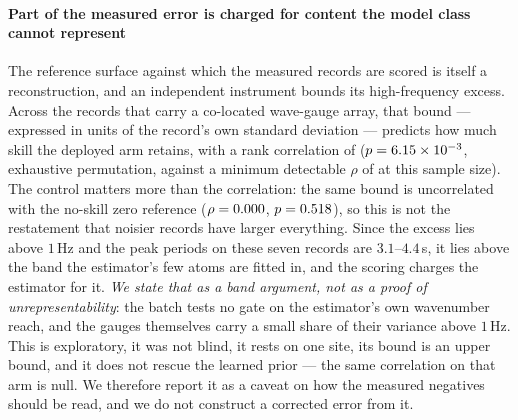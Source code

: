 \documentclass[review]{elsarticle}
\begin{document}
\paragraph{Part of the measured error is charged for content the model class cannot represent}
The reference surface against which the measured records are scored is itself a
reconstruction, and an independent instrument bounds its high-frequency excess. Across
the \RSevenN{} records that carry a co-located wave-gauge array, that bound --- expressed
in units of the record's own standard deviation --- predicts how much skill the deployed
arm retains, with a rank correlation of \RSevenRho{} ($p = 6.15\times 10^{-3}{}$, exhaustive
permutation, against a minimum detectable $\rho$ of \RSevenMDE{} at this sample size).
The control matters more than the correlation: the same bound is uncorrelated with the
no-skill zero reference ($\rho = 0.000{}$, $p = 0.518{}$), so this is not
the restatement that noisier records have larger everything. Since the excess lies above
$1$\,Hz and the peak periods on these seven records are $3.1$--$4.4$\,s, it lies above the
band the estimator's few atoms are fitted in, and the scoring charges the estimator for
it. \emph{We state that as a band argument, not as a proof of unrepresentability}: the
batch tests no gate on the estimator's own wavenumber reach, and the gauges themselves
carry a small share of their variance above $1$\,Hz. This
is exploratory, it was not blind, it rests on one site, its bound is an upper bound, and
it does not rescue the learned prior --- the same correlation on that arm is null. We
therefore report it as a caveat on how the measured negatives should be read, and we do
not construct a corrected error from it.

\end{document}

